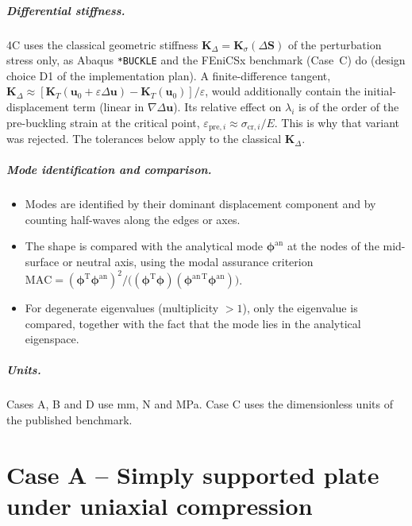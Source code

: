 \documentclass[11pt,a4paper]{report}
\newcommand{\bu}{\bm{u}}
\newcommand{\K}{\mathbf{K}}
\newcommand{\KT}{\mathbf{K}_T}
\newcommand{\KD}{\mathbf{K}_\Delta}
\begin{document}
\paragraph{Differential stiffness.}
4C uses the classical geometric stiffness $\KD = \K_\sigma(\Delta\bm{S})$ of
the perturbation stress only, as Abaqus \texttt{*BUCKLE} and the FEniCSx
benchmark (Case~C) do (design choice D1 of the implementation plan).
A finite-difference tangent,
$\KD \approx [\KT(\bu_0+\varepsilon\Delta\bu)-\KT(\bu_0)]/\varepsilon$, would
additionally contain the initial-displacement term (linear in
$\nabla\Delta\bu$). Its relative effect on $\lambda_i$ is of the order of the
pre-buckling strain at the critical point,
$\varepsilon_{\text{pre},i}\approx\sigma_{\text{cr},i}/E$. This is why that
variant was rejected. The tolerances below apply to the classical
$\KD$.

\paragraph{Mode identification and comparison.}
\begin{itemize}
\item Modes are identified by their dominant displacement component and by
  counting half-waves along the edges or axes.
\item The shape is compared with the analytical mode $\bm{\phi}^\text{an}$ at
  the nodes of the mid-surface or neutral axis, using the modal assurance
  criterion
  $\text{MAC} = (\bm{\phi}^\text{T}\bm{\phi}^\text{an})^2 /
  \bigl((\bm{\phi}^\text{T}\bm{\phi})(\bm{\phi}^{\text{an}\,\text{T}}\bm{\phi}^\text{an})\bigr)$.
\item For degenerate eigenvalues (multiplicity $>1$), only the eigenvalue is
  compared, together with the fact that the mode lies in the analytical
  eigenspace.
\end{itemize}

\paragraph{Units.}
Cases A, B and D use \si{mm}, \si{N} and \si{MPa}. Case C uses the
dimensionless units of the published benchmark.

\chapter{Case A -- Simply supported plate under uniaxial compression}
\label{ch:plate}
\end{document}
